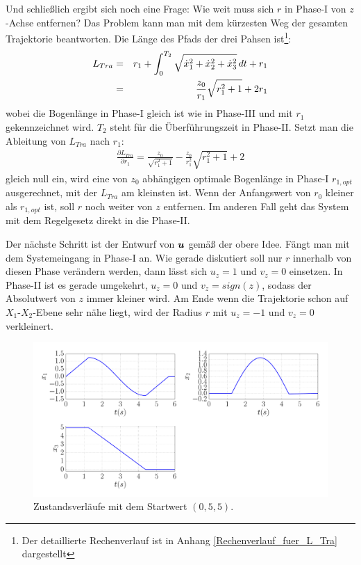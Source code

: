 Und schließlich ergibt sich noch eine Frage: Wie weit muss sich $r$ in Phase-I von $z$-Achse entfernen? Das Problem kann man mit dem kürzesten Weg der gesamten Trajektorie beantworten. Die Länge des Pfads der drei Pahsen ist\footnote{Der detaillierte Rechenverlauf ist in Anhang \ref{Rechenverlauf_fuer_L_Tra} dargestellt}: 
\begin{eqnarray}
L_{Tra} &=& r_1 + \int_{0}^{T_{2}} \sqrt{\dot x_1^2 + \dot x_2^2 + \dot x_3^2 }\, dt + r_1 \notag\\&=& \frac{z_{0}}{r_{1}}\sqrt{r_{1}^{2}+1} + 2r_{1}
\label{eq:Länge_der_Schraubenkurve}
\end{eqnarray} 
wobei die Bogenlänge in Phase-I gleich ist wie in Phase-III und mit $r_{1}$ gekennzeichnet wird. $T_{2}$ steht für die Überführungszeit in Phase-II. Setzt man die Ableitung von $L_{Tra}$ nach $r_{1}$:
\begin{eqnarray}
\frac{\partial L_{Tra}}{\partial r_{1}} = \frac{z_{0}}{\sqrt{r_{1}^{2} + 1}} - \frac{z_{0}}{r_{1}^{2}} \sqrt{r_{1}^{2} + 1} + 2
\label{eq:Ableitung_von_L_Tra}
\end{eqnarray} 
gleich null ein, wird eine von $z_{0}$ abhängigen optimale Bogenlänge in Phase-I $r_{1,opt}$ ausgerechnet, mit der $L_{Tra}$ am kleinsten ist. Wenn der Anfangswert von $r_{0}$ kleiner als $r_{1,opt}$ ist, soll $r$ noch weiter von $z$ entfernen. Im anderen Fall geht das System mit dem Regelgesetz direkt in die Phase-II.

Der nächste Schritt ist der Entwurf von $\boldsymbol u$ gemäß der obere Idee. Fängt man mit dem Systemeingang in Phase-I an. Wie gerade diskutiert soll nur $r$ innerhalb von diesen Phase verändern werden, dann lässt sich $u_{z}=1$ und $v_{z}=0$ einsetzen. In Phase-II ist es gerade umgekehrt, $u_{z}=0$ und $v_{z}=sign(z)$, sodass der Absolutwert von $z$ immer kleiner wird. Am Ende wenn die Trajektorie schon auf $X_{1}$-$X_{2}$-Ebene sehr nähe liegt, wird der Radius $r$ mit $u_{z}=-1$ und $v_{z}=0$ verkleinert. 

\begin{figure}[!h]
	\centering
	\includegraphics[width=\linewidth]{bild/30_32/Brockett_e2_ck_x.pdf}%
	\caption{Zustandsverläufe mit dem Startwert $(0,5,5)$.}
	\label{fig:Brockett_e2_ck_ein_Fall}
\end{figure}

